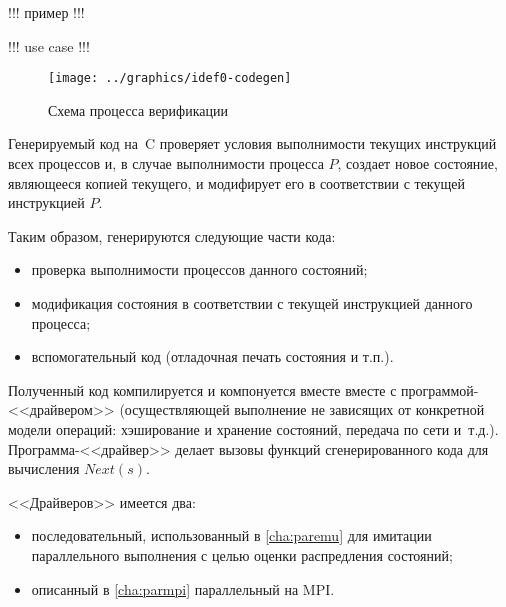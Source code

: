 
!!! пример !!!

!!! use case !!! 

\begin{figure}[ht]
  \centering
  \texttt{[image: ../graphics/idef0-codegen]}  
  \caption{Схема процесса верификации}
\label{fig:idef0-codegen}
\end{figure}

Генерируемый код на~C проверяет условия выполнимости текущих инструкций всех процессов и,
в случае выполнимости процесса $P$, создает новое состояние, являющееся копией текущего, и
модифирует его в соответствии с текущей инструкцией $P$.

Таким образом, генерируются следующие части кода:

\begin{itemize}
\item проверка выполнимости процессов данного состояний;
\item модификация состояния в соответствии с текущей инструкцией данного процесса;
\item вспомогательный код (отладочная печать состояния и т.п.).
\end{itemize}

Полученный код компилируется и компонуется вместе вместе с программой-<<драйвером>>
(осуществляющей выполнение не зависящих от конкретной модели операций: хэширование и
хранение состояний, передача по сети и~т.д.). Программа-<<драйвер>> делает вызовы функций
сгенерированного кода для вычисления $Next(s)$.

<<Драйверов>> имеется два: 

\begin{itemize}
\item последовательный, использованный в \ref{cha:paremu} для имитации параллельного
  выполнения с целью оценки распредления состояний;
\item описанный в \ref{cha:parmpi} параллельный на MPI.
\end{itemize}

